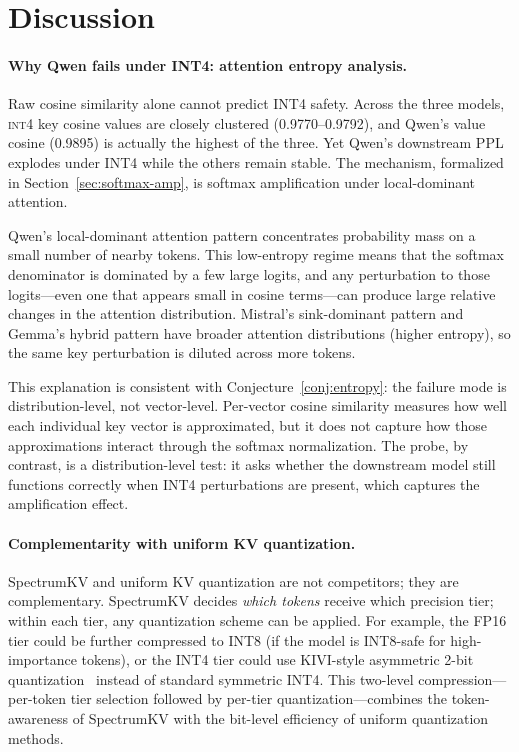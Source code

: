 \documentclass[11pt]{article}
\newcommand{\method}{SpectrumKV}
\newcommand{\intiv}{\textsc{int4}}
\theoremstyle{plain}
\theoremstyle{definition}
\begin{document}
\section{Discussion}
\label{sec:discussion}

\paragraph{Why Qwen fails under INT4: attention entropy analysis.}
Raw cosine similarity alone cannot predict INT4 safety.  Across the three models, \intiv{} key cosine values are closely clustered (0.9770--0.9792), and Qwen's value cosine (0.9895) is actually the highest of the three.  Yet Qwen's downstream PPL explodes under INT4 while the others remain stable.  The mechanism, formalized in Section~\ref{sec:softmax-amp}, is softmax amplification under local-dominant attention.

Qwen's local-dominant attention pattern concentrates probability mass on a small number of nearby tokens.  This low-entropy regime means that the softmax denominator is dominated by a few large logits, and any perturbation to those logits---even one that appears small in cosine terms---can produce large relative changes in the attention distribution.  Mistral's sink-dominant pattern and Gemma's hybrid pattern have broader attention distributions (higher entropy), so the same key perturbation is diluted across more tokens.

This explanation is consistent with Conjecture~\ref{conj:entropy}: the failure mode is distribution-level, not vector-level.  Per-vector cosine similarity measures how well each individual key vector is approximated, but it does not capture how those approximations interact through the softmax normalization.  The probe, by contrast, is a distribution-level test: it asks whether the downstream model still functions correctly when INT4 perturbations are present, which captures the amplification effect.

\paragraph{Complementarity with uniform KV quantization.}
\method{} and uniform KV quantization are not competitors; they are complementary.  \method{} decides \emph{which tokens} receive which precision tier; within each tier, any quantization scheme can be applied.  For example, the FP16 tier could be further compressed to INT8 (if the model is INT8-safe for high-importance tokens), or the INT4 tier could use KIVI-style asymmetric 2-bit quantization~\citep{kivi} instead of standard symmetric INT4.  This two-level compression---per-token tier selection followed by per-tier quantization---combines the token-awareness of \method{} with the bit-level efficiency of uniform quantization methods.
\end{document}
